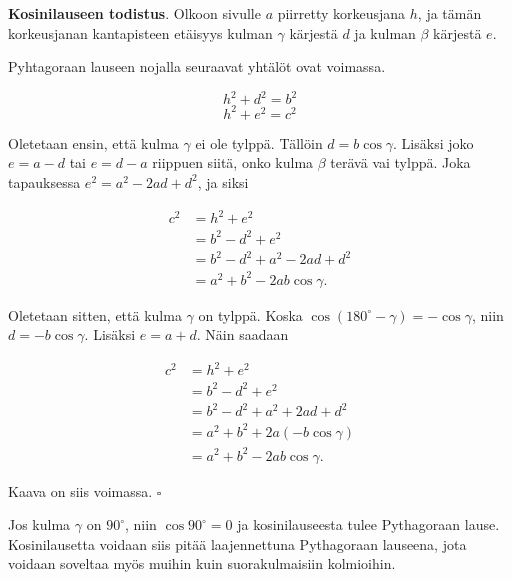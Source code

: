 \textbf{Kosinilauseen todistus}. Olkoon sivulle $a$ piirretty korkeusjana $h$, ja tämän
korkeusjanan kantapisteen etäisyys kulman $\gamma$ kärjestä $d$ ja kulman $\beta$ kärjestä $e$.



Pyhtagoraan lauseen nojalla seuraavat yhtälöt ovat voimassa.

\[
h^2 + d^2 = b^2
\]
\[
h^2 + e^2 = c^2
\]

Oletetaan ensin, että kulma $\gamma$ ei ole tylppä. Tällöin $d = b \cos \gamma$.
Lisäksi joko $e = a - d$ tai $e = d - a$ riippuen siitä, onko kulma $\beta$ terävä vai
tylppä. Joka tapauksessa $e^2 = a^2 - 2ad + d^2$, ja siksi

\begin{align*}
c^2 &= h^2 + e^2 \\
&= b^2 - d^2 + e^2 \\
&= b^2 - d^2 + a^2 - 2 a d + d^2 \\
&= a^2 + b^2 - 2 a b \cos \gamma .
\end{align*}

Oletetaan sitten, että kulma $\gamma$ on tylppä. Koska $\cos (180^{\circ} - \gamma )
= - \cos \gamma$, niin $d = -b \cos \gamma$. Lisäksi $e = a + d$. Näin saadaan

\begin{align*}
c^2 &= h^2 + e^2 \\
&= b^2 - d^2 + e^2 \\
&= b^2 - d^2 + a^2 + 2 a d + d^2 \\
&= a^2 + b^2 + 2 a(- b \cos \gamma ) \\
&= a^2 + b^2 - 2 a b \cos \gamma .
\end{align*}

Kaava on siis voimassa. $\square$

Jos kulma $\gamma$ on $90^\circ$, niin $\cos 90^\circ=0$ ja kosinilauseesta tulee Pythagoraan lause. Kosinilausetta voidaan siis pitää laajennettuna Pythagoraan lauseena, jota voidaan soveltaa myös muihin kuin suorakulmaisiin kolmioihin.